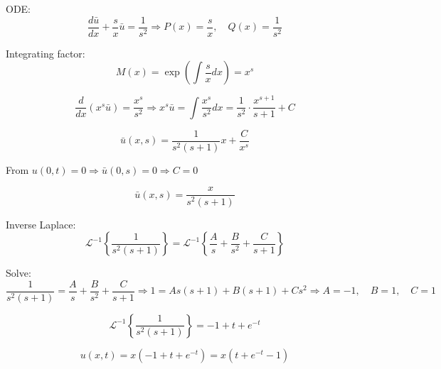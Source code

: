 \documentclass{article}
\begin{document}
ODE:
\[
\frac{d\bar{u}}{dx} + \frac{s}{x} \bar{u} = \frac{1}{s^2}
\Rightarrow
P(x) = \frac{s}{x}, \quad Q(x) = \frac{1}{s^2}
\]

Integrating factor:
\[
M(x) = \exp\left( \int \frac{s}{x} dx \right) = x^s
\]

\[
\frac{d}{dx}(x^s \bar{u}) = \frac{x^s}{s^2}
\Rightarrow
x^s \bar{u} = \int \frac{x^s}{s^2} dx = \frac{1}{s^2} \cdot \frac{x^{s+1}}{s+1} + C
\]

\[
\bar{u}(x,s) = \frac{1}{s^2(s+1)} x + \frac{C}{x^s}
\]

From $u(0,t) = 0 \Rightarrow \bar{u}(0,s) = 0 \Rightarrow C = 0$

\[
\bar{u}(x,s) = \frac{x}{s^2(s+1)}
\]

Inverse Laplace:
\[
\mathcal{L}^{-1} \left\{ \frac{1}{s^2(s+1)} \right\}
= \mathcal{L}^{-1} \left\{ \frac{A}{s} + \frac{B}{s^2} + \frac{C}{s+1} \right\}
\]

Solve:
\[
\frac{1}{s^2(s+1)} = \frac{A}{s} + \frac{B}{s^2} + \frac{C}{s+1}
\Rightarrow
1 = A s (s+1) + B (s+1) + C s^2
\Rightarrow
A = -1, \quad B = 1, \quad C = 1
\]

\[
\mathcal{L}^{-1} \left\{ \frac{1}{s^2(s+1)} \right\} = -1 + t + e^{-t}
\]

\[
u(x,t) = x (-1 + t + e^{-t}) = x (t + e^{-t} - 1)
\]

\newpage
\end{document}
